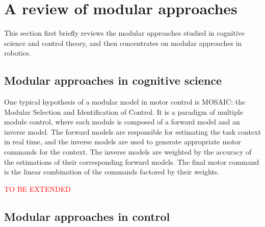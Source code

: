 \section{A review of modular approaches}
\label{cha2:sec3}
This section first briefly reviews the modular approaches studied in cognitive science and control theory, and then concentrates on modular approaches in robotics.

\subsection{Modular approaches in cognitive science}
\label{cha2:sec3:cognitive}

One typical hypothesis of a modular model in motor control is MOSAIC: the Modular Selection and Identification of Control. It is a paradigm of multiple module control, where each module is composed of a forward model and an inverse model. The forward models are responsible for estimating the task context in real time, and the inverse models are used to generate appropriate motor commands for the context. The inverse models are weighted by the accuracy of the estimations of their corresponding forward models. The final motor command is the linear combination of the commands factored by their weights.

\textcolor{red}{TO BE EXTENDED}

\subsection{Modular approaches in control}
\label{cha2:sec3:control}


